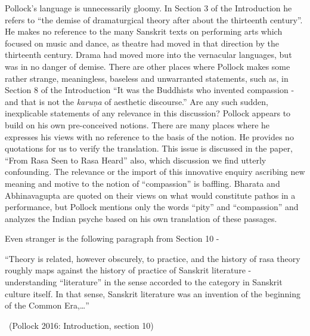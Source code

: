 Pollock’s language is unnecessarily gloomy. In Section 3 of the Introduction he refers to “the demise of dramaturgical theory after about the thirteenth century”. He makes no reference to the many Sanskrit texts on performing arts which focused on music and dance, as theatre had moved in that direction by the thirteenth century. Drama had moved more into the vernacular languages, but was in no danger of demise. There are other places where Pollock makes some rather strange, meaningless, baseless and unwarranted statements, such as, in Section 8 of the Introduction “It was the Buddhists who invented compassion - and that is not the \textit{karuṇa} of aesthetic discourse.” Are any such sudden, inexplicable statements of any relevance in this discussion? Pollock appears to build on his own pre-conceived notions. There are many places where he expresses his views with no reference to the basis of the notion. He provides no quotations for us to verify the translation. This issue is discussed in the paper, “From Rasa Seen to Rasa Heard” also, which discussion we find utterly confounding. The relevance or the import of this innovative enquiry ascribing new meaning and motive to the notion of “compassion” is baffling. Bharata and Abhinavagupta are quoted on their views on what would constitute pathos in a performance, but Pollock mentions only the words “pity” and “compassion” and analyzes the Indian psyche based on his own translation of these passages.

Even stranger is the following paragraph from Section 10 -

\begin{myquote}
“Theory is related, however obscurely, to practice, and the history of rasa theory roughly maps against the history of practice of Sanskrit literature - understanding “literature” in the sense accorded to the category in Sanskrit culture itself. In that sense, Sanskrit literature was an invention of the beginning of the Common Era,…” 

~\hfill (Pollock 2016: Introduction, section 10)
\end{myquote}

